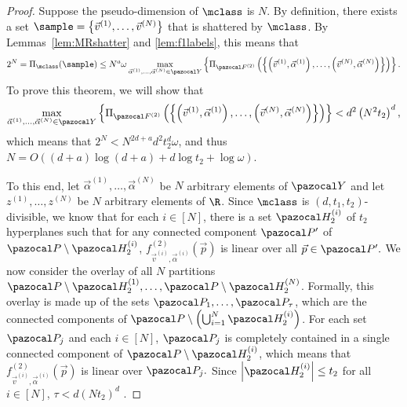 \begin{proof}
Suppose the pseudo-dimension of $\mclass$ is $N$. By definition, there exists a set $\sample = \left\{\vec{v}^{(1)}, \dots, \vec{v}^{(N)}\right\}$ that is shattered by $\mclass$. By Lemmas~\ref{lem:MRshatter} and \ref{lem:f1labels}, this means that \[2^N = \Pi_{\mclass}(\sample) \leq N^a\omega \max_{\vec{\alpha}^{(1)}, \dots, \vec{\alpha}^{(N)} \in \range} \left\{ \Pi_{\fclass^{(2)}} \left(\left\{ \left(\vec{v}^{(1)}, \vec{\alpha}^{(1)}\right), \dots, \left(\vec{v}^{(N)}, \vec{\alpha}^{(N)}\right)\right\}\right)\right\}.\] To prove this theorem, we will show that \begin{equation}\max_{\vec{\alpha}^{(1)}, \dots, \vec{\alpha}^{(N)} \in \range} \left\{ \Pi_{\fclass^{(2)}} \left(\left\{ \left(\vec{v}^{(1)}, \vec{\alpha}^{(1)}\right), \dots, \left(\vec{v}^{(N)}, \vec{\alpha}^{(N)}\right)\right\}\right)\right\} < d^2 \left(N^2t_2\right)^d,\label{eq:shattering}\end{equation} which means that $2^N < N^{2d+a}d^2t_2^d\omega$, and thus $N= O\left((d+a) \log(d+a) + d \log t_2 + \log \omega\right)$.

To this end, let $\vec{\alpha}^{(1)}, \dots, \vec{\alpha}^{(N)}$ be $N$ arbitrary elements of $\range$ and let $z^{(1)}, \dots, z^{(N)}$ be $N$ arbitrary elements of $\R$. Since $\mclass$ is $(d, t_1, t_2)$-divisible, we know that for each $i \in [N]$, there is a set $\hyp_2^{(i)}$ of $t_2$ hyperplanes such that for any connected component $\pspace'$ of $\pspace \setminus \hyp_2^{(i)}$, $f^{(2)}_{\vec{v}^{(i)}, \vec{\alpha}^{(i)}}\left(\vec{p}\right)$ is linear over all $\vec{p} \in \pspace'.$  We now consider the overlay of all $N$ partitions $\pspace\setminus \hyp_2^{(1)}, \dots, \pspace\setminus \hyp_2^{(N)}$. Formally, this overlay is made up of the sets $\pspace_1, \dots, \pspace_{\tau}$, which are the connected components 
of $\pspace \setminus \left(\bigcup_{i = 1}^N \hyp_2^{(i)}\right)$. For each set $\pspace_j$ and each $i \in [N]$, $\pspace_j$ is completely contained in a single connected component of $\pspace \setminus \hyp_2^{(i)}$, which means that $f^{(2)}_{\vec{v}^{(i)}, \vec{\alpha}^{(i)}}\left(\vec{p}\right)$ is linear over $\pspace_j.$
Since $\left|\hyp^{(i)}_2\right|\leq t_2$ for all $i \in [N]$, $\tau < d(Nt_2)^d$ \citep{Buck43:Partition}.


\end{proof}
